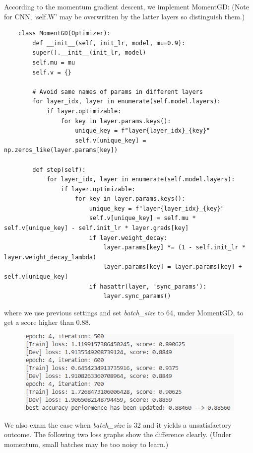 \documentclass[]{article}
\begin{document}
According to the momentum gradient descent, we implement MomentGD: (Note for CNN, `self.W' may be overwritten by the latter layers so distinguish them.)
\begin{lstlisting}
	class MomentGD(Optimizer):
		def __init__(self, init_lr, model, mu=0.9):
		super().__init__(init_lr, model)
		self.mu = mu
		self.v = {}
	
		# Avoid same names of params in different layers
		for layer_idx, layer in enumerate(self.model.layers):
			if layer.optimizable:
				for key in layer.params.keys():
					unique_key = f"layer{layer_idx}_{key}"
					self.v[unique_key] = np.zeros_like(layer.params[key])
			
		def step(self):
			for layer_idx, layer in enumerate(self.model.layers):
				if layer.optimizable:
					for key in layer.params.keys():
						unique_key = f"layer{layer_idx}_{key}"
						self.v[unique_key] = self.mu * self.v[unique_key] - self.init_lr * layer.grads[key]
						if layer.weight_decay:
							layer.params[key] *= (1 - self.init_lr * layer.weight_decay_lambda)
							layer.params[key] = layer.params[key] + self.v[unique_key]
						if hasattr(layer, 'sync_params'):
							layer.sync_params()
\end{lstlisting}
where we use previous settings and set \textit{batch\_size} to 64, under MomentGD, to get a score higher than 0.88.
\begin{figure}[H]
	\centering
	\includegraphics[width=0.7\linewidth]{Q2}
	\caption{}
	\label{fig:q2}
\end{figure}

We also exam the case when  \textit{batch\_size} is 32 and it yields a unsatisfactory outcome. The following two loss graphs show the difference clearly. (Under momentum, small batches may be too noisy to learn.)
\end{document}

